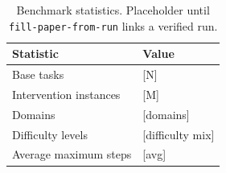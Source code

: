\begin{table}[t]
\centering
\caption{Benchmark statistics. Placeholder until \texttt{fill-paper-from-run} links a verified run.}
\label{tab:benchmark-stats}
\begin{tabular}{ll}
\toprule
Statistic & Value \\
\midrule
Base tasks & [N] \\
Intervention instances & [M] \\
Domains & [domains] \\
Difficulty levels & [difficulty mix] \\
Average maximum steps & [avg] \\
\bottomrule
\end{tabular}
\end{table}
